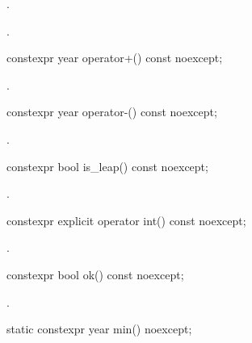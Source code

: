 \begin{itemdescr}
\pnum
\effects
{}.

\pnum
\returns
{}.
\end{itemdescr}

%
\begin{itemdecl}
constexpr year operator+() const noexcept;
\end{itemdecl}

\begin{itemdescr}
\pnum
\returns
{}.
\end{itemdescr}

%
\begin{itemdecl}
constexpr year operator-() const noexcept;
\end{itemdecl}

\begin{itemdescr}
\pnum
\returns
{}.
\end{itemdescr}

%
\begin{itemdecl}
constexpr bool is_leap() const noexcept;
\end{itemdecl}

\begin{itemdescr}
\pnum
\returns
{}.
\end{itemdescr}

%
\begin{itemdecl}
constexpr explicit operator int() const noexcept;
\end{itemdecl}

\begin{itemdescr}
\pnum
\returns
{}.
\end{itemdescr}

%
\begin{itemdecl}
constexpr bool ok() const noexcept;
\end{itemdecl}

\begin{itemdescr}
\pnum
\returns
{}.
\end{itemdescr}

%
\begin{itemdecl}
static constexpr year min() noexcept;
\end{itemdecl}

